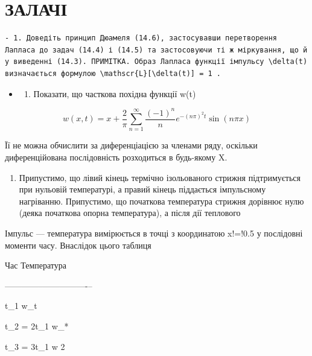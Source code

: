 \documentclass[
  ukrainian,
]{article}
\providecommand{\tightlist}{%
  \setlength{\itemsep}{0pt}\setlength{\parskip}{0pt}}
\begin{document}
\section{ЗАЛАЧІ}\label{ux437ux430ux43bux430ux447ux456}

\begin{verbatim}
- 1. Доведіть принцип Дюамеля (14.6), застосувавши перетворення Лапласа до задач (14.4) і (14.5) та застосовуючи ті ж міркування, що й у виведенні (14.3). ПРИМІТКА. Образ Лапласа функції імпульсу \delta(t) визначається формулою \mathscr{L}[\delta(t)] = 1 .
\end{verbatim}

\begin{itemize}
\tightlist
\item
  \begin{enumerate}
  \def\labelenumi{\arabic{enumi}.}
  \setcounter{enumi}{1}
  \tightlist
  \item
    Показати, що часткова похідна функції w(t)
  \end{enumerate}
\end{itemize}

\[
w(x, t) = x + \frac{2}{\pi} \sum_{n=1}^{\infty} \frac{(-1)^n}{n} e^{-(n\pi)^2 t} \sin(n\pi x)
\]

Її не можна обчислити за диференціацією за членами ряду, оскільки
диференційована послідовність розходиться в будь-якому X.

\begin{enumerate}
\def\labelenumi{\arabic{enumi}.}
\setcounter{enumi}{2}
\tightlist
\item
  Припустимо, що лівий кінець термічно ізольованого стрижня
  підтримується при нульовій температурі, а правий кінець піддається
  імпульсному нагріванню. Припустимо, що початкова температура стрижня
  дорівнює нулю (деяка початкова опорна температура), а після дії
  теплового
\end{enumerate}

Імпульс --- температура вимірюється в точці з координатою x!=!0.5 у
послідовні моменти часу. Внаслідок цього таблиця

Час \textbar{} Температура \textbar{} \textbar{}

\textbar--------------\textbar----------------\textbar--\textbar{}

t\_1 \textbar{} w\_t \textbar{} \textbar{}

t\_2 = 2t\_1 \textbar{} w\_* \textbar{} \textbar{}

t\_3 = 3t\_1 \textbar{} w 2 \textbar{} \textbar{}
\end{document}
